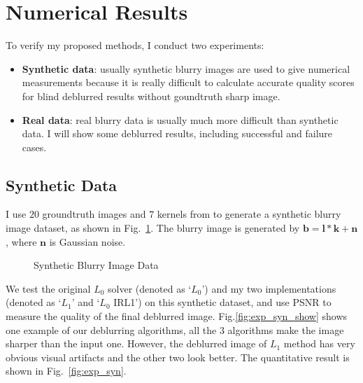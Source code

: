 \documentclass[journal, onecolumn, 10pt]{IEEEtran}
\begin{document}
\section{Numerical Results}
\label{sec:exp}
To verify my proposed methods, I conduct two experiments:
\begin{itemize}
\item \textbf{Synthetic data}: usually synthetic blurry images are used to give numerical measurements because it is really difficult to calculate accurate quality scores for blind deblurred results without goundtruth sharp image. 
\item \textbf{Real data}: real blurry data is usually much more difficult than synthetic data. I will show some deblurred results, including successful and failure cases.
\end{itemize} 
 
\subsection{Synthetic Data}
\label{sec:exp_syn}
I use $20$ groundtruth images and $7$ kernels from \cite{lai2016comparative}\cite{levin2009understanding} to generate a synthetic blurry image dataset, as shown in Fig.~\ref{fig:synthetic_blur_data}. The blurry image is generated by $\mathbf{b} = \mathbf{l} * \mathbf{k} + \mathbf{n}$, where $\mathbf{n}$ is Gaussian noise.

\begin{figure}[h!]
\centering
{}
\hspace{\fill}
\hspace{\fill}
\caption{Synthetic Blurry Image Data}
\label{fig:synthetic_blur_data}
\end{figure}

We test the original $L_0$ solver \cite{xu2013unnatural} (denoted as `$L_0$') and my two implementations (denoted as `$L_1$' and `$L_0$ IRL1') on this synthetic dataset, and use PSNR to measure the quality of the final deblurred image. Fig.\ref{fig:exp_syn_show} shows one example of our deblurring algorithms, all the $3$ algorithms make the image sharper than the input one. However, the deblurred image of $L_1$ method has very obvious visual artifacts and the other two look better. The quantitative result is shown in Fig.~\ref{fig:exp_syn}.
\end{document}

